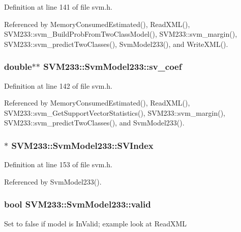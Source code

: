Definition at line 141 of file svm.\+h.



Referenced by Memory\+Consumed\+Estimated(), Read\+X\+M\+L(), S\+V\+M233\+::svm\+\_\+\+Build\+Prob\+From\+Two\+Class\+Model(), S\+V\+M233\+::svm\+\_\+margin(), S\+V\+M233\+::svm\+\_\+predict\+Two\+Classes(), Svm\+Model233(), and Write\+X\+M\+L().

\subsubsection[{\texorpdfstring{sv\+\_\+coef}{sv_coef}}]{\setlength{\rightskip}{0pt plus 5cm}double$\ast$$\ast$ S\+V\+M233\+::\+Svm\+Model233\+::sv\+\_\+coef}\hypertarget{struct_s_v_m233_1_1_svm_model233_ac60e898fcd1028cc699269ef5995df06}{}\label{struct_s_v_m233_1_1_svm_model233_ac60e898fcd1028cc699269ef5995df06}


Definition at line 142 of file svm.\+h.



Referenced by Memory\+Consumed\+Estimated(), Read\+X\+M\+L(), S\+V\+M233\+::svm\+\_\+\+Get\+Support\+Vector\+Statistics(), S\+V\+M233\+::svm\+\_\+margin(), S\+V\+M233\+::svm\+\_\+predict\+Two\+Classes(), and Svm\+Model233().

\subsubsection[{\texorpdfstring{S\+V\+Index}{SVIndex}}]{$\ast$ S\+V\+M233\+::\+Svm\+Model233\+::\+S\+V\+Index}\hypertarget{struct_s_v_m233_1_1_svm_model233_ac4aa6c377a9c6deaffb168fe0885fcdf}{}\label{struct_s_v_m233_1_1_svm_model233_ac4aa6c377a9c6deaffb168fe0885fcdf}


Definition at line 153 of file svm.\+h.



Referenced by Svm\+Model233().

\subsubsection[{\texorpdfstring{valid}{valid}}]{\setlength{\rightskip}{0pt plus 5cm}bool S\+V\+M233\+::\+Svm\+Model233\+::valid}\hypertarget{struct_s_v_m233_1_1_svm_model233_a875589b5c20a1d5a3b2d21d88706abc0}{}\label{struct_s_v_m233_1_1_svm_model233_a875589b5c20a1d5a3b2d21d88706abc0}
Set to false if model is In\+Valid; example look at Read\+X\+ML 

